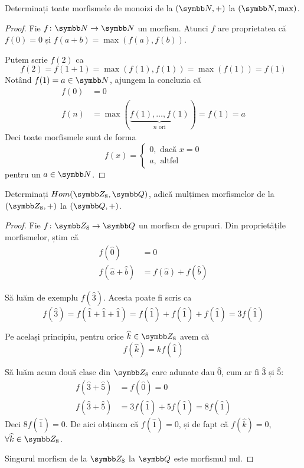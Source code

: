 \begin{exercise}
Determinați toate morfismele de monoizi de la \((\naturals, +)\) la \((\naturals, \max)\).
\end{exercise}
\begin{proof}
Fie \(\function{f}{\naturals}{\naturals}\) un morfism. Atunci \(f\) are proprietatea că \(f(0) = 0\) și \(f(a + b) = \max(f(a), f(b))\).

Putem scrie \(f(2)\) ca
\[
    f(2) = f(1 + 1) = \max(f(1), f(1)) = \max(f(1)) = f(1)
\]
Notând \(f(1) = a \in \naturals\), ajungem la concluzia că
\begin{align*}
    f(0) &= 0 \\
    f(n) &= \max(\underbrace{f(1), \dots, f(1)}_{n \text{ ori}}) = f(1) = a
\end{align*}
Deci toate morfismele sunt de forma
\[
    f(x) =
    \begin{cases}
        0, \text{ dacă } x = 0 \\
        a, \text{ altfel }
    \end{cases}
\]
pentru un \(a \in \naturals\).
\end{proof}

\begin{exercise}
Determinați \(\mathop{Hom}(\integersmod{8}, \rationals)\), adică mulțimea morfismelor de la \((\integersmod{8}, +)\) la \((\rationals, +)\).
\end{exercise}
\begin{proof}
Fie \(\function{f}{\integersmod{8}}{\rationals}\) un morfism de grupuri. Din proprietățile morfismelor, știm că
\begin{align*}
    f(\widehat{0}) &= 0 \\
    f(\widehat{a} + \widehat{b}) &= f(\widehat{a}) + f(\widehat{b})
\end{align*}

Să luăm de exemplu \(f(\widehat{3})\). Acesta poate fi scris ca
\[
    f(\widehat{3}) = f(\widehat{1} + \widehat{1} + \widehat{1}) = f(\widehat{1}) + f(\widehat{1}) + f(\widehat{1}) = 3 f(\widehat{1})
\]

Pe același principiu, pentru orice \(\widehat{k} \in \integersmod{8}\) avem că
\[
    f(\widehat{k}) = k f(\widehat{1})
\]

Să luăm acum două clase din \(\integersmod{8}\) care adunate dau \(\widehat{0}\), cum ar fi \(\widehat{3}\) și \(\widehat{5}\):
\begin{align*}
    f(\widehat{3} + \widehat{5}) &= f(\widehat{0}) = 0 \\
    f(\widehat{3} + \widehat{5}) &= 3 f(\widehat{1}) + 5 f(\widehat{1}) = 8 f(\widehat{1})
\end{align*}
Deci \(8 f(\widehat{1}) = 0\). De aici obținem că \(f(\widehat{1}) = 0\), și de fapt că \(f(\widehat{k}) = 0\), \(\forall \widehat{k} \in \integersmod{8}\).

Singurul morfism de la \(\integersmod{8}\) la \(\rationals\) este morfismul nul.
\end{proof}


